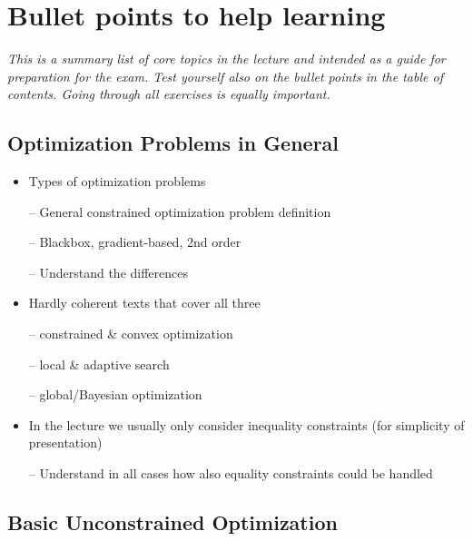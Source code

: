 
\clearpage

\section{Bullet points to help learning}

\emph{This is a summary list of core topics in the lecture and
  intended as a guide for preparation for the exam. Test yourself also
  on the bullet points in the table of contents. Going through all
  exercises is equally important.}


\subsection{Optimization Problems in General}

\begin{itemize}
\item Types of optimization problems

-- General constrained optimization problem definition

-- Blackbox, gradient-based, 2nd order

-- Understand the differences

\item Hardly coherent texts that cover all three

-- constrained \& convex optimization

-- local \& adaptive search

-- global/Bayesian optimization

\item In the lecture we usually only consider inequality constraints
  (for simplicity of presentation)

-- Understand in all cases how also equality constraints could be
handled
\end{itemize}


\subsection{Basic Unconstrained Optimization}

